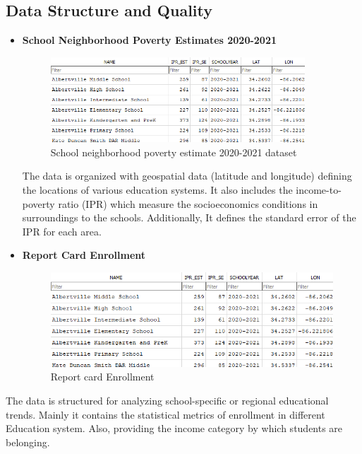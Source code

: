 \documentclass[a4paper,11pt]{article}
\begin{document}
    \subsection{Data Structure and Quality}
        \begin{itemize}
            \item \textbf{School Neighborhood Poverty Estimates 2020-2021} 
            \begin{figure}[ht!]
                \centering
                \includegraphics[width=0.9\textwidth]{images/SchoolNeighborhoodPovertyData.png}
                \caption{School neighborhood poverty estimate 2020-2021 dataset}
                \label{fig:dataset1}
            \end{figure}
            
            The data is organized with geospatial data (latitude and longitude) defining the locations of various education systems. It also includes the income-to-poverty ratio (IPR) which measure the socioeconomics conditions in surroundings to the schools. Additionally, It defines the standard error of the IPR for each area.
            
\newpage
            \item \textbf{Report Card Enrollment} 
            \begin{figure}[h!]
                \centering
                \includegraphics[width=0.9\linewidth]{images/SchoolNeighborhoodPovertyData.png}
                \caption{Report card Enrollment}
                \label{fig:dataset2}
            \end{figure}
        \end{itemize} The data is structured for analyzing school-specific or regional educational trends. Mainly it contains the statistical metrics of enrollment in different Education system. Also, providing the income category by which students are belonging. 
\end{document}

